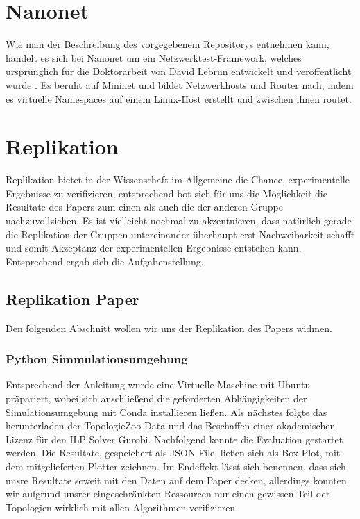\documentclass[sigconf,noacm,review]{acmart}
\begin{document}
\section{Nanonet}
Wie man der Beschreibung des vorgegebenem Repositorys \cite{nikolaussuess-nanonet} entnehmen kann, handelt es sich bei Nanonet um ein Netzwerktest-Framework, welches ursprünglich für die Doktorarbeit von David Lebrun entwickelt und veröffentlicht wurde \cite{original-nanonet}. Es beruht auf Mininet \cite{mininet} und bildet Netzwerkhosts und Router nach, indem es virtuelle Namespaces auf einem Linux-Host erstellt und zwischen ihnen routet.

\section{Replikation}
Replikation bietet in der Wissenschaft im Allgemeine die Chance, experimentelle Ergebnisse zu verifizieren, entsprechend bot sich für uns die Möglichkeit die Resultate des Papers zum einen als auch die der anderen Gruppe nachzuvollziehen. Es ist vielleicht nochmal zu akzentuieren, dass natürlich gerade die Replikation der Gruppen untereinander überhaupt erst Nachweibarkeit schafft und somit Akzeptanz der experimentellen Ergebnisse entstehen kann. Entsprechend ergab sich die Aufgabenstellung.
\subsection{Replikation Paper}
Den folgenden Abschnitt wollen wir uns der Replikation des Papers \cite{10.1145/3485983.3494846} widmen. 
\subsubsection{Python Simmulationsumgebung}
Entsprechend der Anleitung wurde eine Virtuelle Maschine mit Ubuntu präpariert, wobei sich anschließend die geforderten Abhängigkeiten der Simulationsumgebung mit Conda installieren ließen. Als nächstes folgte das herunterladen der TopologieZoo Data und das Beschaffen einer akademischen Lizenz für den ILP Solver Gurobi. Nachfolgend konnte die Evaluation gestartet werden. Die Resultate, gespeichert als JSON File, ließen sich als Box Plot, mit dem mitgelieferten Plotter zeichnen. 
Im Endeffekt lässt sich benennen, dass sich unsre Resultate soweit mit den Daten auf dem Paper decken, allerdings konnten wir aufgrund unsrer eingeschränkten Ressourcen nur einen gewissen Teil der Topologien wirklich mit allen Algorithmen verifizieren. 
\end{document}
